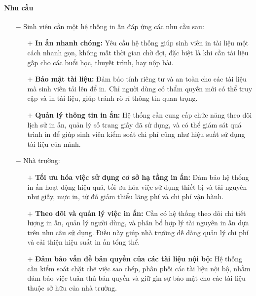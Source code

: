 \documentclass[a4paper]{article}
\begin{document}
\paragraph*{Nhu cầu}
\begin{itemize}
    \item[$-$] Sinh viên cần một hệ thống in ấn đáp ứng các nhu cầu sau:
    \begin{itemize}
        \item[$+$] \textbf{In ấn nhanh chóng:} Yêu cầu hệ thống giúp sinh viên in tài liệu một cách nhanh gọn, không mất thời gian chờ đợi, đặc biệt là khi cần tài liệu gấp cho các buổi học, thuyết trình, hay nộp bài.
        \item[$+$] \textbf{Bảo mật tài liệu:} Đảm bảo tính riêng tư và an toàn cho các tài liệu mà sinh viên tải lên để in. Chỉ người dùng có thẩm quyền mới có thể truy cập và in tài liệu, giúp tránh rò rỉ thông tin quan trọng.
        \item[$+$] \textbf{Quản lý thông tin in ấn:} Hệ thống cần cung cấp chức năng theo dõi lịch sử in ấn, quản lý số trang giấy đã sử dụng, và có thể giám sát quá trình in để giúp sinh viên kiểm soát chi phí cũng như hiệu suất sử dụng tài liệu của mình.
    \end{itemize}
    \item[$-$] Nhà trường:
    \begin{itemize}
        \item[$+$] \textbf{Tối ưu hóa việc sử dụng cơ sở hạ tầng in ấn:} Đảm bảo hệ thống in ấn hoạt động hiệu quả, tối ưu hóa việc sử dụng thiết bị và tài nguyên như giấy, mực in, từ đó giảm thiểu lãng phí và chi phí vận hành.
        \item[$+$] \textbf{Theo dõi và quản lý việc in ấn:} Cần có hệ thống theo dõi chi tiết lượng in ấn, quản lý người dùng, và phân bổ hợp lý tài nguyên in ấn dựa trên nhu cầu sử dụng. Điều này giúp nhà trường dễ dàng quản lý chi phí và cải thiện hiệu suất in ấn tổng thể.
        \item[$+$] \textbf{Đảm bảo vấn đề bản quyền của các tài liệu nội bộ:} Hệ thống cần kiểm soát chặt chẽ việc sao chép, phân phối các tài liệu nội bộ, nhằm đảm bảo việc tuân thủ bản quyền và giữ gìn sự bảo mật cho các tài liệu thuộc sở hữu của nhà trường.
    \end{itemize}
\end{itemize}
\end{document}
